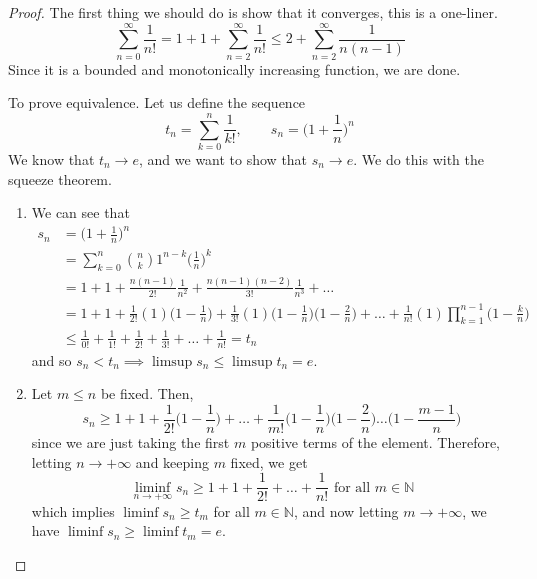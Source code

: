  \begin{proof}
    The first thing we should do is show that it converges, this is a one-liner. 
    \begin{equation}
      \sum_{n=0}^\infty \frac{1}{n!} = 1 + 1 + \sum_{n=2}^\infty \frac{1}{n!} \leq 2 + \sum_{n=2}^\infty \frac{1}{n(n-1)} 
    \end{equation}
    Since it is a bounded and monotonically increasing function, we are done. 

    To prove equivalence. Let us define the sequence 
    \begin{equation}
      t_n = \sum_{k=0}^n \frac{1}{k!}, \qquad s_n = \bigg( 1 + \frac{1}{n} \bigg)^n
    \end{equation}
    We know that $t_n \rightarrow e$, and we want to show that $s_n \rightarrow e$. We do this with the squeeze theorem. 
    \begin{enumerate}
      \item We can see that 
      \begin{align}
        s_n & = \bigg( 1 + \frac{1}{n} \bigg)^n \\ 
            & = \sum_{k=0}^n \binom{n}{k} 1^{n-k} \bigg( \frac{1}{n} \bigg)^k \\
            & = 1 + 1 + \frac{n(n-1)}{2!} \frac{1}{n^2} + \frac{n(n-1)(n-2)}{3!} \frac{1}{n^3} + \ldots \\ 
            & = 1 + 1 + \frac{1}{2!} (1) \bigg( 1 - \frac{1}{n} \bigg) + \frac{1}{3!} (1) \bigg(1 - \frac{1}{n} \bigg) \bigg(1 - \frac{2}{n} \bigg) + \ldots + \frac{1}{n!} (1) \prod_{k=1}^{n-1} \bigg(1 - \frac{k}{n} \bigg) \\
            & \leq \frac{1}{0!} + \frac{1}{1!} + \frac{1}{2!} + \frac{1}{3!} + \ldots + \frac{1}{n!} = t_n 
      \end{align}
      and so $s_n < t_n \implies \limsup s_n \leq \limsup t_n = e$. 

      \item Let $m \leq n$ be fixed. Then, 
      \begin{equation}
        s_n \geq 1 + 1 + \frac{1}{2!} \bigg( 1 - \frac{1}{n} \bigg) + \ldots + \frac{1}{m!} \bigg(1 - \frac{1}{n} \bigg) \bigg(1 - \frac{2}{n} \bigg) \ldots \bigg(1 - \frac{m-1}{n} \bigg) 
      \end{equation}
      since we are just taking the first $m$ positive terms of the element. Therefore, letting $n \rightarrow +\infty$ and keeping $m$ fixed, we get 
      \begin{equation}
        \liminf_{n \rightarrow +\infty} s_n \geq 1 + 1 + \frac{1}{2!} + \ldots + \frac{1}{n!} \text{ for all } m \in \mathbb{N}
      \end{equation}
      which implies $\liminf s_n \geq t_m$ for all $m \in \mathbb{N}$, and now letting $m \rightarrow +\infty$, we have $\liminf s_n \geq \liminf t_m = e$. 
    \end{enumerate}
  \end{proof}
  
